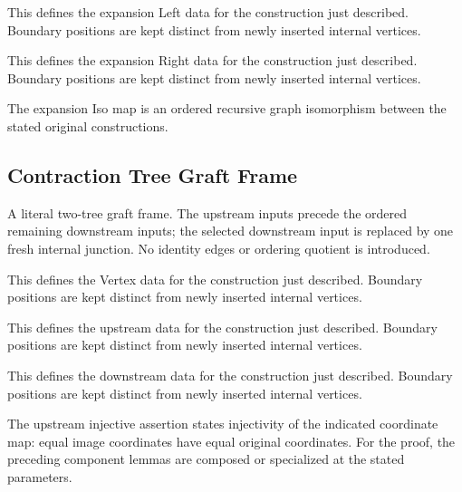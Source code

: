 This defines the expansion Left data for the construction just described. Boundary positions are kept distinct from newly inserted internal vertices.
\par{}

This defines the expansion Right data for the construction just described. Boundary positions are kept distinct from newly inserted internal vertices.
\par{}

The expansion Iso map is an ordered recursive graph isomorphism between the stated original constructions.
\par{}

\subsection{Contraction Tree Graft Frame}
A literal two-tree graft frame. The upstream inputs precede the ordered remaining downstream inputs; the selected downstream input is replaced by one fresh internal junction. No identity edges or ordering quotient is introduced.

This defines the Vertex data for the construction just described. Boundary positions are kept distinct from newly inserted internal vertices.
\par{}

This defines the upstream data for the construction just described. Boundary positions are kept distinct from newly inserted internal vertices.
\par{}

This defines the downstream data for the construction just described. Boundary positions are kept distinct from newly inserted internal vertices.
\par{}

The upstream injective assertion states injectivity of the indicated coordinate map: equal image coordinates have equal original coordinates.
For the proof, the preceding component lemmas are composed or specialized at the stated parameters.
\par{}

